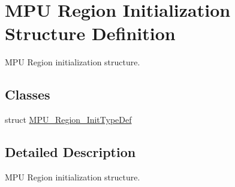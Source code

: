 \hypertarget{group___c_o_r_t_e_x___m_p_u___region___initialization___structure__definition}{}\section{M\+PU Region Initialization Structure Definition}
\label{group___c_o_r_t_e_x___m_p_u___region___initialization___structure__definition}


M\+PU Region initialization structure.  


\subsection*{Classes}
\begin{DoxyCompactItemize}
\item 
struct \hyperlink{struct_m_p_u___region___init_type_def}{M\+P\+U\+\_\+\+Region\+\_\+\+Init\+Type\+Def}
\end{DoxyCompactItemize}


\subsection{Detailed Description}
M\+PU Region initialization structure. 

